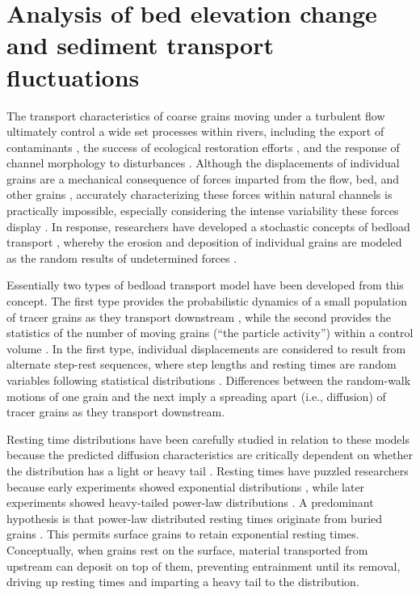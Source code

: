 
\chapter{Analysis of bed elevation change and sediment transport fluctuations}
\label{ch:ch3}

The transport characteristics of coarse grains moving under a turbulent flow ultimately control a wide set processes within rivers, including the export of contaminants \citep{Malmon2005,Macklin2006}, the success of ecological restoration efforts \citep{Gaeuman2017}, and the response of channel morphology to disturbances \citep{Hassan2017}.
Although the displacements of individual grains are a mechanical consequence of forces imparted from the flow, bed, and other grains \citep{Wiberg1985, Vowinckel2014,Gonzalez2017}, accurately characterizing these forces within natural channels is practically impossible, especially considering the intense variability these forces display \citep{Schmeeckle2007,Celik2010, Dwivedi2011}.
In response, researchers have developed a stochastic concepts of bedload transport \citep{Einstein1937}, whereby the erosion and deposition of individual grains are modeled as the random results of undetermined forces \citep{Einstein1950,Paintal1971,Ancey2006}.

Essentially two types of bedload transport model have been developed from this concept.
The first type provides the probabilistic dynamics of a small population of tracer grains as they transport downstream \citep{Einstein1937,Hubbell1964, Nakagawa1976,Martin2012,Lajeunesse2017,Wu2019}, while the second provides the statistics of the number of moving grains (``the particle activity'') within a control volume \citep{Einstein1950,Ancey2006,Furbish2012a}.
In the first type, individual displacements are considered to result from alternate step-rest sequences, where step lengths and resting times are random variables following statistical distributions \citep{Einstein1937}. 
Differences between the random-walk motions of one grain and the next imply a spreading apart (i.e., diffusion) of tracer grains as they transport downstream.

Resting time distributions have been carefully studied in relation to these models because the predicted diffusion characteristics are critically dependent on whether the distribution has a light or heavy tail \citep{Bradley2017,Martin2012,Weeks1998}.
Resting times have puzzled researchers because early experiments showed exponential distributions \citep{Einstein1937,Hubbell1964, Yano1969,Yano1969a,Nakagawa1976}, while later experiments showed heavy-tailed power-law distributions \citep{Martin2012,Voepel2013, Olinde2015, Pretzlav2016a, Bradley2017, Liu2019}.
A predominant hypothesis is that power-law distributed resting times originate from buried grains \citep{Martin2014,Voepel2013}. This permits surface grains to retain exponential resting times. 
Conceptually, when grains rest on the surface, material transported from upstream can deposit on top of them, preventing entrainment until its removal, driving up resting times and imparting a heavy tail to the distribution.

